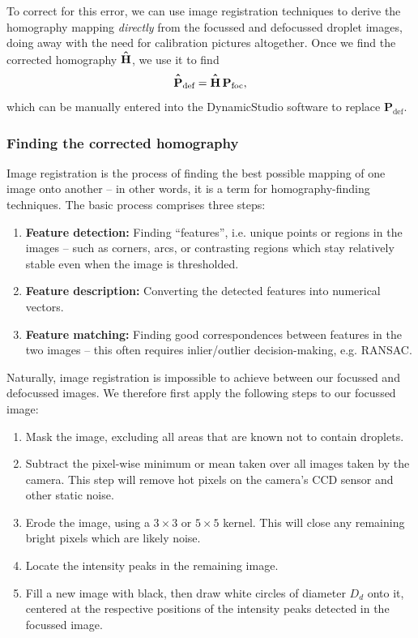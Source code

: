 \documentclass[10pt]{book}
\newcommand*{\Hhat}{\hat{\vphantom{\scalebox{1.2}{H}} H}}
\newcommand*{\Phat}{\hat{\vphantom{\scalebox{1.2}{P}} P}}
\begin{document}
To correct for this error, we can use image registration techniques to derive
the homography mapping \emph{directly} from the focussed and defocussed droplet
images, doing away with the need for calibration pictures altogether. Once we
find the corrected homography $\mathbf{\Hhat}$, we use it to find
\begin{equation}
    \mathbf{\Phat}_\text{def} = \mathbf{\Hhat} \, \mathbf{P}_\text{foc},
    \label{corrected-homography-use}
\end{equation}
which can be manually entered into the DynamicStudio software to replace
$\mathbf{P}_\text{def}$.

\subsubsection{Finding the corrected homography}
Image registration is the process of finding the best possible mapping of one
image onto another -- in other words, it is a term for homography-finding
techniques. The basic process comprises three steps:
\begin{enumerate}
    \item \textbf{Feature detection:} Finding ``features'', i.e. unique points or regions in the images --
        such as corners, arcs, or contrasting regions which stay
        relatively stable even when the image is thresholded.
    \item \textbf{Feature description:} Converting the detected features into
        numerical vectors.
    \item \textbf{Feature matching:} Finding good correspondences between
        features in the two images -- this often requires inlier/outlier
        decision-making, e.g. RANSAC.
\end{enumerate}

Naturally, image registration is impossible to achieve between our focussed and
defocussed images. We therefore first apply the following steps to our focussed
image:

\begin{enumerate}
    \item Mask the image, excluding all areas that are known not to contain
        droplets.
    \item Subtract the pixel-wise minimum or mean taken over all images taken by
        the camera. This step will remove hot pixels on the camera's CCD sensor
        and other static noise.
    \item Erode the image, using a $3 \times 3$ or $5 \times 5$ kernel. This
        will close any remaining bright pixels which are likely noise.
    \item Locate the intensity peaks in the remaining image.
    \item Fill a new image with black, then draw white circles of diameter $D_d$
        onto it, centered at the respective positions of the intensity peaks
        detected in the focussed image.
\end{enumerate}
\end{document}
